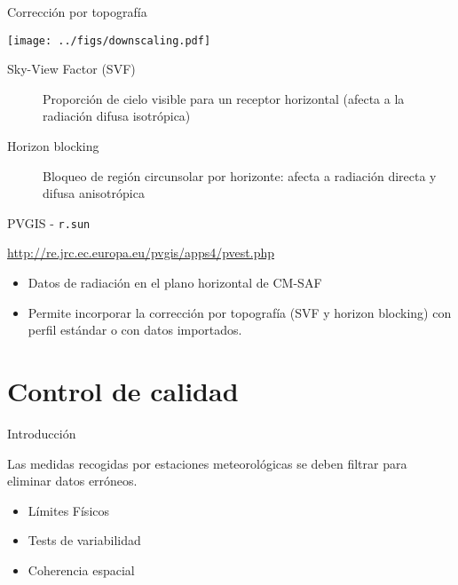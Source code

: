 \documentclass[aspectratio=169, usenames,svgnames,dvipsnames]{beamer}
\begin{document}
\begin{frame}[label={sec:org6179585}]{Corrección por topografía}
\begin{center}
\begin{center}
\texttt{[image: ../figs/downscaling.pdf]}
\end{center}
\end{center}

\begin{description}
\item[{Sky-View Factor (SVF)}] Proporción de cielo visible para un receptor horizontal (afecta a la radiación difusa isotrópica)

\item[{Horizon blocking}] Bloqueo de región circunsolar por horizonte: afecta a radiación directa y difusa anisotrópica
\end{description}


\nocite{Bosch.Batlles.ea2010}
\nocite{Tovar-Pescador.Pozo-Vazquez.ea2006}
\nocite{Antonanzas-Torres.MartinezdePison.ea2013}
\nocite{Hofierka.Suri2002}
\end{frame}

\begin{frame}[label={sec:orgfb4e3ee},fragile]{PVGIS - \texttt{r.sun}}
 \begin{block}{\url{http://re.jrc.ec.europa.eu/pvgis/apps4/pvest.php}}
\begin{itemize}
\item Datos de radiación en el plano horizontal de CM-SAF
\item Permite incorporar la corrección por topografía (SVF y horizon blocking) con perfil estándar o con datos importados.
\end{itemize}
\end{block}
\end{frame}
\section{Control de calidad}
\label{sec:orga1b3eb3}
\begin{frame}[label={sec:org7722952}]{Introducción}
\begin{block}{Las medidas recogidas por estaciones meteorológicas se deben filtrar para eliminar datos erróneos.}
\begin{itemize}
\item Límites Físicos
\item Tests de variabilidad
\item Coherencia espacial
\end{itemize}
\end{block}
\end{frame}
\end{document}
